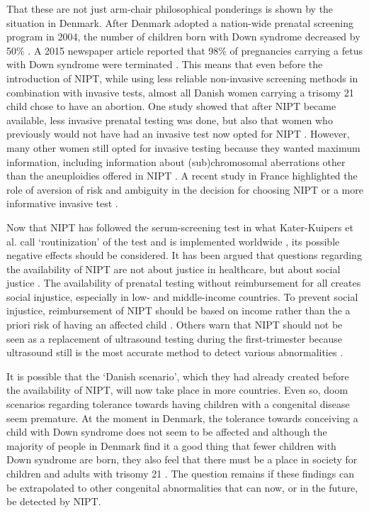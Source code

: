 That these are not just arm-chair philosophical ponderings is shown by the situation in Denmark. 
After Denmark adopted a nation-wide prenatal screening program in 2004, the number of children born with Down syndrome decreased by 50\% \cite{Ekelund_2008,Lou_2018}. 
A 2015 newspaper article reported that 98\% of pregnancies carrying a fetus with Down syndrome were terminated \cite{Kastberg_2015}. 
This means that even before the introduction of NIPT, while using less reliable non-invasive screening methods in combination with invasive tests, almost all Danish women carrying a trisomy 21 child chose to have an abortion. 
One study showed that after NIPT became available, less invasive prenatal testing was done, but also that women who previously would not have had an invasive test now opted for NIPT \cite{Bjerregaard_2017}. 
However, many other women still opted for invasive testing because they wanted maximum information, including information about (sub)chromosomal aberrations other than the aneuploidies offered in NIPT \cite{Lou_2018}. 
A recent study in France highlighted the role of aversion of risk and ambiguity in the decision for choosing NIPT or a more informative invasive test \cite{Seror_2019}.

Now that NIPT has followed the serum-screening test in what Kater-Kuipers et al. call ‘routinization’ of the test \cite{Kater_Kuipers_2018} and is implemented worldwide \cite{Alysse_2015}, its possible negative effects should be considered. 
It has been argued that questions regarding the availability of NIPT are not about justice in healthcare, but about social justice \cite{Rolfes_2016}. 
The availability of prenatal testing without reimbursement for all creates social injustice, especially in low- and middle-income countries. 
To prevent social injustice, reimbursement of NIPT should be based on income rather than the a priori risk of having an affected child \cite{Rolfes_2016}. 
Others warn that NIPT should not be seen as a replacement of ultrasound testing during the first-trimester because ultrasound still is the most accurate method to detect various abnormalities \cite{Costa_2017}.

It is possible that the ‘Danish scenario’, which they had already created before the availability of NIPT, will now take place in more countries. 
Even so, doom scenarios regarding tolerance towards having children with a congenital disease seem premature. 
At the moment in Denmark, the tolerance towards conceiving a child with Down syndrome does not seem to be affected and although the majority of people in Denmark find it a good thing that fewer children with Down syndrome are born, they also feel that there must be a place in society for children and adults with trisomy 21 \cite{Joachim_2017}. 
The question remains if these findings can be extrapolated to other congenital abnormalities that can now, or in the future, be detected by NIPT.

